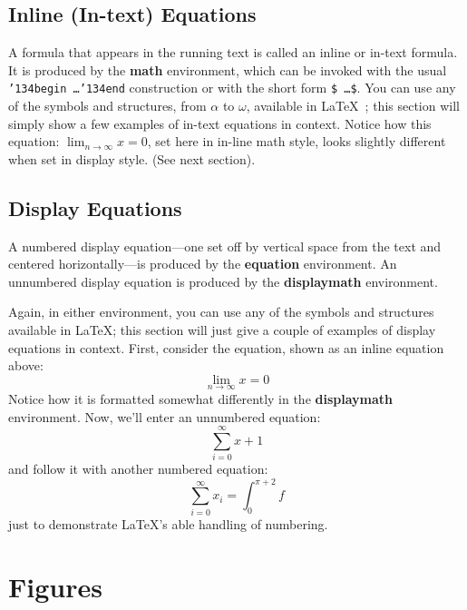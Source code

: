 \subsection{Inline (In-text) Equations}
A formula that appears in the running text is called an inline or
in-text formula.  It is produced by the \textbf{math} environment,
which can be invoked with the usual
\texttt{{\char'134}begin\,\ldots{\char'134}end} construction or with
the short form \texttt{\$\,\ldots\$}. You can use any of the symbols
and structures, from $\alpha$ to $\omega$, available in
\LaTeX~\cite{Lamport:LaTeX}; this section will simply show a few
examples of in-text equations in context. Notice how this equation:
\begin{math}
  \lim_{n\rightarrow \infty}x=0
\end{math},
set here in in-line math style, looks slightly different when
set in display style.  (See next section).

\subsection{Display Equations}
A numbered display equation---one set off by vertical space from the
text and centered horizontally---is produced by the \textbf{equation}
environment. An unnumbered display equation is produced by the
\textbf{displaymath} environment.

Again, in either environment, you can use any of the symbols and
structures available in \LaTeX\@; this section will just give a couple
of examples of display equations in context.  First, consider the
equation, shown as an inline equation above:
\begin{equation}
  \lim_{n\rightarrow \infty}x=0
\end{equation}
Notice how it is formatted somewhat differently in
the \textbf{displaymath}
environment.  Now, we'll enter an unnumbered equation:
\begin{displaymath}
  \sum_{i=0}^{\infty} x + 1
\end{displaymath}
and follow it with another numbered equation:
\begin{equation}
  \sum_{i=0}^{\infty}x_i=\int_{0}^{\pi+2} f
\end{equation}
just to demonstrate \LaTeX's able handling of numbering.

\section{Figures}

